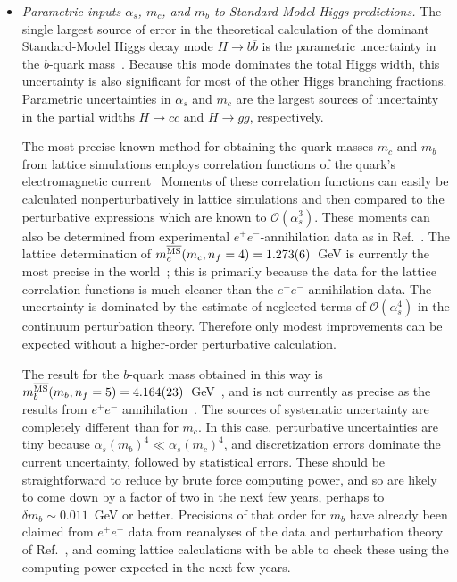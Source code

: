 \begin{itemize}

\item {\it Parametric inputs $\alpha_s$, $m_c$, and $m_b$ to Standard-Model Higgs predictions.}  The single largest source of error in the theoretical calculation of the dominant Standard-Model Higgs decay mode $H\rightarrow b\overline{b}$ is  the parametric uncertainty in the $b$-quark mass~\cite{Denner:2011mq}.  Because this mode dominates the total Higgs width, this uncertainty is also significant for most of the other Higgs branching fractions.  Parametric uncertainties in $\alpha_s$ and $m_c$ are the largest sources of uncertainty in the partial widths $H\rightarrow c\overline{c}$ and $H\rightarrow gg$, respectively.
 
The most precise known method for obtaining the quark masses $m_c$ and $m_b$ from lattice simulations employs correlation functions of the quark's electromagnetic current~\cite{Allison:2008xk,McNeile:2010ji}  Moments of these correlation functions can easily be calculated nonperturbatively in lattice simulations and then compared to the perturbative expressions which are known to ${\mathcal O}(\alpha_s^3)$.  These moments can also be determined from experimental $e^+e^-$-annihilation data as in Ref.~\cite{Chetyrkin:2009fv}.  The lattice determination of $m_c^{\overline{\rm MS}}(m_c,n_f=4)= 1.273(6)$~GeV is currently the most precise in the world~\cite{Beringer:1900zz}; this is primarily because the data for the lattice correlation functions is much cleaner than the $e^+e^-$ annihilation data.  The uncertainty is dominated by the estimate of neglected terms of ${\mathcal O}(\alpha_s^4)$ in the continuum perturbation theory.  Therefore only modest improvements can be expected without a higher-order perturbative calculation.  

The result for the $b$-quark mass obtained in this way is
$m_b^{\overline{\rm MS}}(m_b, n_f=5) = 4.164(23)$~GeV~\cite{McNeile:2010ji}, and is not currently as precise as the results from
 $e^+e^-$ annihilation~\cite{Chetyrkin:2009fv,Beringer:1900zz}.
The sources of systematic uncertainty  are completely different than for $m_c$.
In this case, perturbative uncertainties are tiny because $\alpha_s(m_b)^4  \ll \alpha_s(m_c)^4$, and discretization errors dominate the current uncertainty, followed by statistical errors.  These should be straightforward to reduce by brute force computing
 power, and so are likely to come down by a factor of two in the next few years, 
 perhaps to $\delta m_b \sim 0.011$~GeV or better.  Precisions of that order for $m_b$ have already been claimed from
 $e^+e^-$ data from
 reanalyses of the data and perturbation theory of Ref.~\cite{Chetyrkin:2009fv}, and coming lattice
 calculations with be able to check these using the computing power expected in the next few years.
 

\end{itemize}
